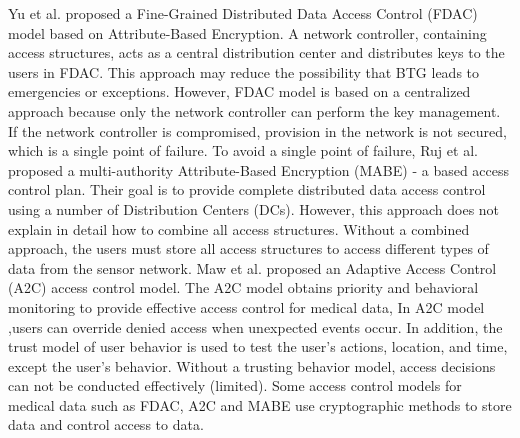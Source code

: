 \documentclass[conference]{IEEEtran}
\begin{document}
Yu et al. \cite{yu2011fdac} proposed a Fine-Grained Distributed Data Access Control (FDAC) model based on Attribute-Based Encryption. 
A network controller, containing access structures, acts as a central distribution center and distributes keys to the users in FDAC. 
This approach may reduce the possibility that BTG leads to emergencies or exceptions.
However, FDAC model is based on a centralized approach because only the network controller can perform the key management. 
If the network controller is compromised, provision in the network is not secured, which is a single point of failure.
To avoid a single point of failure, Ruj et al. \cite{ruj2011distributed} proposed a multi-authority Attribute-Based Encryption (MABE) - a based access control plan. 
Their goal is to provide complete distributed data access control using a number of Distribution Centers (DCs). 
However, this approach does not explain in detail how to combine all access structures. 
Without a combined approach, the users must store all access structures to access different types of data from the sensor network. 
Maw et al. \cite{maw2013adaptive} proposed an Adaptive Access Control (A2C) access control model. 
The A2C  model obtains priority and behavioral monitoring to provide effective access control for medical data,
In A2C model ,users can override denied access when unexpected events occur.
In addition, the trust model of user behavior is used to test the user's actions, location, and time, except the user's behavior. 
Without a trusting behavior model, access decisions can not be conducted effectively (limited). 
Some access control models for medical data such as FDAC, A2C and MABE use cryptographic methods to store data and control access to data. 
\end{document}
